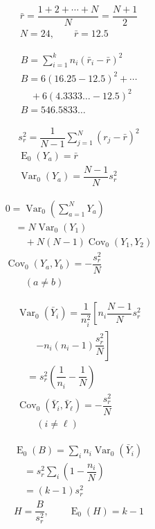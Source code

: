 \[
\begin{gathered}
\bar r=\dfrac{1+2+\cdots+N}{N}=\dfrac{N+1}{2} \\
N=24,\qquad \bar r=12.5
\end{gathered}
\]

\[
\begin{gathered}
B=\sum_{i=1}^{k}n_i(\bar r_i-\bar r)^2 \\
B=6(16.25-12.5)^2+\cdots \\
\quad +6(4.3333\ldots-12.5)^2 \\
B=546.5833\ldots
\end{gathered}
\]

\[
\begin{gathered}
s_r^2=\dfrac{1}{N-1}\sum_{j=1}^{N}(r_j-\bar r)^2 \\
\operatorname{E}_0(Y_a)=\bar r \\
\operatorname{Var}_0(Y_a)=\dfrac{N-1}{N}s_r^2
\end{gathered}
\]

\[
\begin{gathered}
0=\operatorname{Var}_0\!\left(\sum_{a=1}^{N}Y_a\right) \\
\quad=N\operatorname{Var}_0(Y_1) \\
\qquad+N(N-1)\operatorname{Cov}_0(Y_1,Y_2) \\
\operatorname{Cov}_0(Y_a,Y_b)=-\dfrac{s_r^2}{N} \\
\qquad (a\ne b)
\end{gathered}
\]

\[
\begin{gathered}
\operatorname{Var}_0(\bar Y_i)=\dfrac{1}{n_i^2}\left[n_i\dfrac{N-1}{N}s_r^2\right. \\
\qquad\left.-n_i(n_i-1)\dfrac{s_r^2}{N}\right] \\
\quad=s_r^2\left(\dfrac{1}{n_i}-\dfrac{1}{N}\right) \\
\operatorname{Cov}_0(\bar Y_i,\bar Y_\ell)=-\dfrac{s_r^2}{N} \\
\qquad (i\ne\ell)
\end{gathered}
\]

\[
\begin{gathered}
\operatorname{E}_0(B)=\sum_i n_i\operatorname{Var}_0(\bar Y_i) \\
\quad=s_r^2\sum_i\left(1-\dfrac{n_i}{N}\right) \\
\quad=(k-1)s_r^2 \\
H=\dfrac{B}{s_r^2},\qquad \operatorname{E}_0(H)=k-1
\end{gathered}
\]

